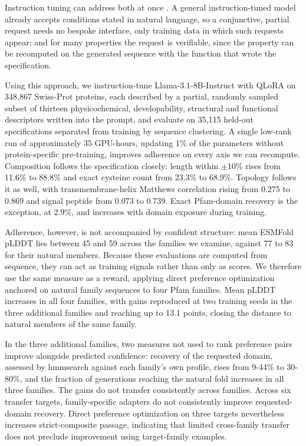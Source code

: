 \documentclass{article} %
\newcommand{\pct}{\%}
\begin{document}
Instruction tuning can address both at once \citep{zhang2023instructiontuning}. A
general instruction-tuned model already accepts conditions stated in natural
language, so a conjunctive, partial request needs no bespoke interface, only
training data in which such requests appear; and for many properties the request
is verifiable, since the property can be recomputed on the generated sequence
with the function that wrote the specification.

Using this approach, we instruction-tune Llama-3.1-8B-Instruct
\citep{dubey2024llama3} with QLoRA \citep{dettmers2023qlora, hu2022lora} on
348{,}867 Swiss-Prot proteins, each described by a partial, randomly sampled
subset of thirteen physicochemical, developability, structural and functional
descriptors written into the prompt, and evaluate on 35{,}115 held-out
specifications separated from training by sequence clustering. A
single low-rank run of approximately 35 GPU-hours, updating 1\pct{} of the
parameters without protein-specific pre-training, improves adherence on every
axis we can recompute. Composition follows the specification closely: length
within $\pm$10\pct{} rises from 11.6\pct{} to 88.8\pct{} and exact cysteine
count from 23.3\pct{} to 68.9\pct. Topology follows it as well, with
transmembrane-helix Matthews correlation rising from 0.275 to 0.869 and signal
peptide from 0.073 to 0.739. Exact Pfam-domain recovery is the exception, at
2.9\pct, and increases with domain exposure during training.

Adherence, however, is not accompanied by confident structure: mean ESMFold
pLDDT lies between 45 and 59 across the families we examine, against 77 to 83
for their natural members. Because these evaluations are computed from sequence,
they can act as training signals rather than only as scores. We
therefore use the same measure as a reward, applying direct preference
optimization \citep{rafailov2023dpo} anchored on natural family sequences to
four Pfam families. 
Mean pLDDT increases in all four families, with gains reproduced at two
training seeds in the three additional families and reaching up to 13.1 points, closing the distance to natural members of the same family.

In the three additional families, two measures not used to rank preference
pairs improve alongside predicted confidence: recovery of the requested
domain, assessed by hmmsearch against each family's own profile, rises
from 9-44\pct{} to 30-80\pct{}, and the fraction of generations reaching
the natural fold increases in all three families. The gains do not transfer consistently across families. Across six transfer targets, family-specific adapters do not consistently improve requested-domain recovery. Direct preference optimization on three targets nevertheless increases strict-composite passage, indicating that limited cross-family transfer does not preclude improvement using target-family examples.
\end{document}
